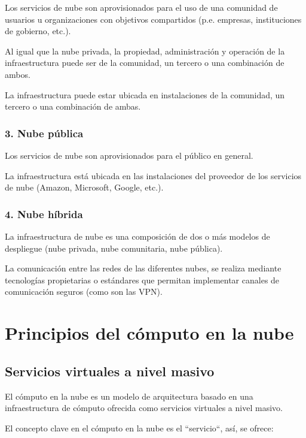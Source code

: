 Los servicios de nube son aprovisionados para el uso de una comunidad de usuarios u organizaciones con objetivos compartidos (p.e. empresas, instituciones de gobierno, etc.).

Al igual que la nube privada, la propiedad, administración y operación de la infraestructura puede ser de la comunidad, un tercero o una combinación de ambos.

La infraestructura puede estar ubicada en instalaciones de la comunidad, un tercero o una combinación de ambas.

\subsection{3. Nube pública}

Los servicios de nube son aprovisionados para el público en general.

La infraestructura está ubicada en las instalaciones del proveedor de los servicios de nube (Amazon, Microsoft, Google, etc.).

\subsection{4. Nube híbrida}

La infraestructura de nube es una composición de dos o más modelos de despliegue (nube privada, nube comunitaria, nube pública).

La comunicación entre las redes de las diferentes nubes, se realiza mediante tecnologías propietarias o estándares que permitan implementar canales de comunicación seguros (como son las VPN).

\chapter{Principios del cómputo en la nube}

\section{Servicios virtuales a nivel masivo}

El cómputo en la nube es un modelo de arquitectura basado en una infraestructura de cómputo ofrecida como servicios virtuales a nivel masivo.

El concepto clave en el cómputo en la nube es el ``servicio``, así, se ofrece:

